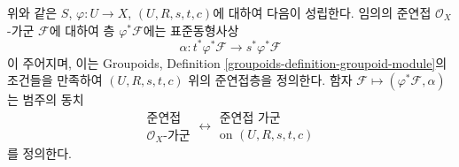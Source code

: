 \begin{proposition}
\label{proposition-quasi-coherent}
위와 같은 $S$, $\varphi : U \to X$, $(U, R, s, t, c)$에 대하여 다음이
성립한다. 임의의 준연접 $\mathcal{O}_X$-가군 $\mathcal{F}$에 대하여
층 $\varphi^*\mathcal{F}$에는 표준동형사상
$$
\alpha : t^*\varphi^*\mathcal{F} \longrightarrow s^*\varphi^*\mathcal{F}
$$
이 주어지며, 이는 Groupoids, Definition
\ref{groupoids-definition-groupoid-module}의 조건들을 만족하여
$(U, R, s, t, c)$ 위의 준연접층을 정의한다. 함자
$\mathcal{F} \mapsto (\varphi^*\mathcal{F}, \alpha)$는 범주의 동치
$$
\begin{matrix}
\text{준연접} \\
\mathcal{O}_X\text{-가군}
\end{matrix}
\longleftrightarrow
\begin{matrix}
\text{준연접 가군}\\
\text{on }(U, R, s, t, c)
\end{matrix}
$$
를 정의한다.
\end{proposition}

